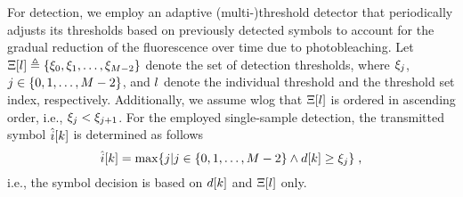 For detection, we employ an adaptive (multi-)threshold detector that periodically adjusts its thresholds based on previously detected symbols to account for the gradual reduction of the fluorescence over time due to photobleaching. Let $\Xi[l] \triangleq \{\xi_0, \xi_1, \hdots, \xi_{M-2}\}$ denote the set of detection thresholds, where $\xi_{j}$, $j \in \{0, 1, \hdots, M-2\}$, and $l$ denote the individual threshold and the threshold set index, respectively. Additionally, we assume \ac{wlog} that $\Xi[l]$ is ordered in ascending order, i.e., $\xi_j < \xi_{j+1}$. For the employed single-sample detection, the transmitted symbol $\hat{{i}}[k]$ is determined as follows
\begin{equation}
\hat{{i}}[k] = \max\{j | j \in \{0, 1, \hdots, M-2\} \wedge d[k] \geq \xi_j\} \;,
\end{equation}
i.e., the symbol decision is based on $d[k]$ and $\Xi[l]$ only.
%
\scaleSubsubsection
